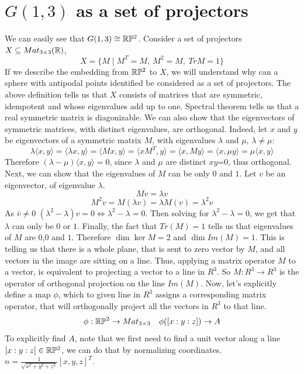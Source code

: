 \documentclass[11pt,a4paper]{report}
\begin{document}
\section{$G(1,3)$ as a set of projectors}\label{g13proj}
We can easily see that $G(1,3) \cong \mathbb{R}\mathbb{P}^2$.
Consider a set of projectors $X \subseteq Mat_{3 \times 3}(\mathbb{R})$,
$$ X = \{ M \mid M^T = M, \: M^2 = M,\: Tr M = 1 \}$$
If we describe the embedding from $\mathbb{R} \mathbb{P}^2$ to $X$, we will understand why can a sphere with antipodal points identified be considered as a set of projectors.
The above definition tells us that $X$ consists of matrices that are symmetric, idempotent and whose eigenvalues add up to one.
Spectral theorem tells us that a real symmetric matrix is diagonizable.
We can also show that the eigenvectors of symmetric matrices, with distinct eigenvalues, are orthogonal.
Indeed, let $x$ and $y$ be eigenvectors of a symmetric matrix $M$, with eigenvalues $\lambda$ and $\mu$, $\lambda \neq \mu$:
$$ \lambda \langle x,y \rangle = \langle \lambda x,  y \rangle = \langle M x, y \rangle = \langle x M^T, y \rangle = \langle x, M y \rangle = \langle x, \mu y \rangle = \mu \langle x, y \rangle  $$
Therefore $(\lambda - \mu) \langle x , y \rangle = 0$, since $\lambda$ and $\mu$ are distinct $xy$=0, thus orthogonal.
Next, we can show that the eigenvalues of $M$ can be only $0$ and $1$.
Let $v$ be an eigenvector, of eigenvalue $\lambda$.
$$ M v = \lambda v $$
$$ M^2 v = M (\lambda v) = \lambda M (v) = \lambda^2 v $$
As $\bar{v} \neq 0$ $(\lambda^2 - \lambda) v = 0 \iff \lambda^2 - \lambda = 0$.
Then solving for $\lambda^2-\lambda = 0$, we get that $\lambda$ can only be $0$ or $1$.
Finally, the fact that $Tr(M)=1$ tells us that eigenvalues of $M$ are $0$,$0$ and $1$.
Therefore $\dim \ker M = 2$ and $ \dim Im(M) = 1 $. This is telling us that there is a whole plane,
that is sent to zero vector by $M$, and all vectors in the image are sitting on a line.
\newline
Thus, applying a matrix operator $M$ to a vector,
is equivalent to projecting a vector to a line in $R^3$.
So $M :R^3 \to R^3$ is the operator of orthogonal projection on the line $Im(M)$.
\newline
Now, let's explicitly define a map $\phi$, which to given line in $R^3$ assigns a corresponding matrix operator,
that will orthogonally project all the vectors in $R^3$ to that line.
$$ \phi: \mathbb{R} \mathbb{P} ^2 \to Mat_{3 \times 3}  \quad \phi([x:y:z]) \to A $$
To explicitly find $A$, note that we first need to find a unit vector along a line $[x:y:z] \in \mathbb{R} \mathbb{P} ^2$,
we can do that by normalizing coordinates. $n = \frac{1}{\sqrt{x^2 + y^2 + z^2}} [x,y,z]^T $.
\end{document}
